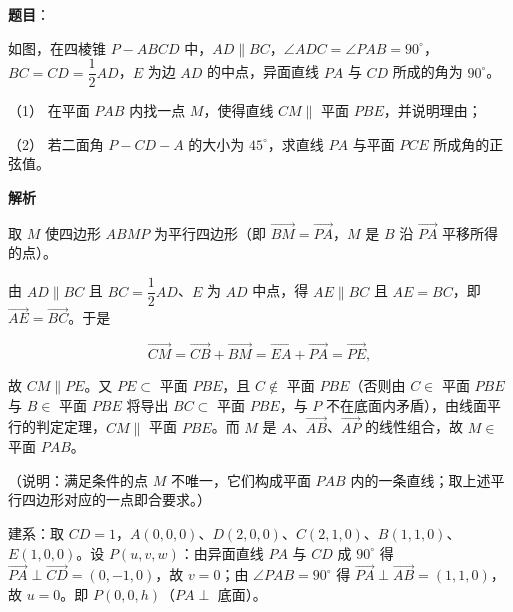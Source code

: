 \begin{answer}

\textbf{题目}：

如图，在四棱锥 \(P-ABCD\) 中，\(AD\parallel BC\)，\(\angle ADC=\angle PAB=90^{\circ}\)，\(BC=CD=\dfrac{1}{2}AD\)，\(E\) 为边 \(AD\) 的中点，异面直线 \(PA\) 与 \(CD\) 所成的角为 \(90^{\circ}\)。
\nopagebreak[4]
\begin{center}\end{center}
\nopagebreak[4]
（1） 在平面 \(PAB\) 内找一点 \(M\)，使得直线 \(CM\parallel\) 平面 \(PBE\)，并说明理由；

（2） 若二面角 \(P-CD-A\) 的大小为 \(45^{\circ}\)，求直线 \(PA\) 与平面 \(PCE\) 所成角的正弦值。


\textbf{解析}


取 \(M\) 使四边形 \(ABMP\) 为平行四边形（即 \(\overrightarrow{BM}=\overrightarrow{PA}\)，\(M\) 是 \(B\) 沿 \(\overrightarrow{PA}\) 平移所得的点）。

由 \(AD\parallel BC\) 且 \(BC=\dfrac{1}{2}AD\)、\(E\) 为 \(AD\) 中点，得 \(AE\parallel BC\) 且 \(AE=BC\)，即 \(\overrightarrow{AE}=\overrightarrow{BC}\)。于是

\nopagebreak[4]
\[
\overrightarrow{CM}=\overrightarrow{CB}+\overrightarrow{BM}=\overrightarrow{EA}+\overrightarrow{PA}=\overrightarrow{PE},
\]

故 \(CM\parallel PE\)。又 \(PE\subset\) 平面 \(PBE\)，且 \(C\notin\) 平面 \(PBE\)（否则由 \(C\in\) 平面 \(PBE\) 与 \(B\in\) 平面 \(PBE\) 将导出 \(BC\subset\) 平面 \(PBE\)，与 \(P\) 不在底面内矛盾），由线面平行的判定定理，\(CM\parallel\) 平面 \(PBE\)。而 \(M\) 是 \(A\)、\(\overrightarrow{AB}\)、\(\overrightarrow{AP}\) 的线性组合，故 \(M\in\) 平面 \(PAB\)。

（说明：满足条件的点 \(M\) 不唯一，它们构成平面 \(PAB\) 内的一条直线；取上述平行四边形对应的一点即合要求。）


建系：取 \(CD=1\)，\(A(0,0,0)\)、\(D(2,0,0)\)、\(C(2,1,0)\)、\(B(1,1,0)\)、\(E(1,0,0)\)。设 \(P(u,v,w)\)：由异面直线 \(PA\) 与 \(CD\) 成 \(90^{\circ}\) 得 \(\overrightarrow{PA}\perp\overrightarrow{CD}=(0,-1,0)\)，故 \(v=0\)；由 \(\angle PAB=90^{\circ}\) 得 \(\overrightarrow{PA}\perp\overrightarrow{AB}=(1,1,0)\)，故 \(u=0\)。即 \(P(0,0,h)\)（\(PA\perp\) 底面）。


\end{answer}
